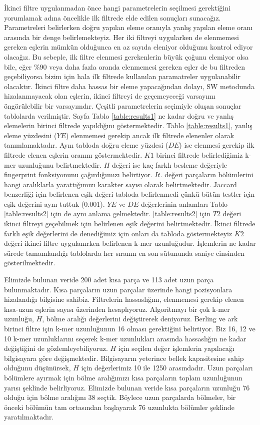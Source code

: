 İkinci filtre uygulanmadan önce hangi parametrelerin seçilmesi gerektiğini yorumlamak adına öncelikle ilk filtrede elde edilen sonuçları sunacağız. Parametreleri belirlerken doğru yapılan eleme oranıyla yanlış yapılan eleme oranı arasında bir denge belirlemekteyiz. Her iki filtreyi uygularken de elenmemesi gereken eşlerin mümkün olduğunca en az sayıda eleniyor olduğunu kontrol ediyor olacağız. Bu sebeple, ilk filtre elenmesi gerekenlerin büyük çoğunu elemiyor olsa bile, eğer \%90 veya daha fazla oranda elenmemesi gereken eşler de bu filtreden geçebiliyorsa bizim için hala ilk filtrede kullanılan paramatreler uygulanabilir olacaktır. İkinci filtre daha hassas bir eleme yapacağından dolayı, SW metodunda hizalanmayacak olan eşlerin, ikinci filtreyi de geçemeyeceği varsayımı öngörülebilir bir varsayımdır. Çeşitli parametrelerin seçimiyle oluşan sonuçlar tablolarda verilmiştir. Sayfa \pageref{table:results1} Tablo \ref{table:results1} ne kadar doğru ve yanlış elemelerin birinci filtrede yapıldığını göstermektedir. Tablo \ref{table:results1}, yanlış eleme yüzdesini ($YE$) elenmemesi gerekip ancak ilk filtrede elenenler olarak tanımlamaktadır. Aynı tabloda doğru eleme yüzdesi ($DE$) ise elenmesi gerekip ilk filtrede elenen eşlerin oranını göstermektedir. $K1$ birinci filtrede belirlediğimiz k-mer uzunluğunu belirtmektedir. $H$ değeri ise kaç farklı besleme değeriyle fingerprint fonksiyonunu çağırdığımızı belirtiyor. $It.$ değeri parçaların bölümlerini hangi aralıklarla yarattığımızı karakter sayısı olarak belirtmektedir. Jaccard benzerliği için belirlenen eşik değeri tabloda belirlenmedi çünkü bütün testler için eşik değerini aynı tuttuk (0.001). $YE$ ve $DE$ değerlerinin anlamları Tablo \ref{table:results2} için de aynı anlama gelmektedir. \ref{table:results2} için $T2$ değeri ikinci filtreyi geçebilmek için belirlenen eşik değerini belirtmektedir. İkinci filtrede farklı eşik değerlerini de denediğimiz için onları da tabloda göstermekteyiz $K2$ değeri ikinci filtre uygulanırken belirlenen k-mer uzunluğudur. İşlemlerin ne kadar sürede tamamlandığı tablolarda her sıranın en son sütununda saniye cinsinden gösterilmektedir.

Elimizde bulunan veride 200 adet kısa parça ve 113 adet uzun parça bulunmaktadır. Kısa parçaların uzun parçalar üzerinde hangi pozisyonlara hizalandığı bilgisine sahibiz. Filtrelerin hassaslığını, elenmemesi gerekip elenen kısa-uzun eşlerin sayısı üzerinden hesaplıyoruz. Algoritmayı bir çok k-mer uzunluğu, $H$, bölme aralığı değerlerini değiştirerek deniyoruz. Berling ve ark \cite{Berlin2015} birinci filtre için k-mer uzunluğunun 16 olması gerektiğini belirtiyor. Biz 16, 12 ve 10 k-mer uzunluklarını seçerek k-mer uzunlukları arasında hassaslığın ne kadar değiştiğini de gözlemleyebiliyoruz. $H$ için seçilen değer işlemlerin yapılacağı bilgisayara göre değişmektedir. Bilgisayarın yeterince bellek kapasitesine sahip olduğunu düşünürsek, $H$ için değerlerimiz 10 ile 1250 arasındadır. Uzun parçaları bölümlere ayırmak için bölme aralığımızı kısa parçaların toplam uzunluğunun yarısı şeklinde belirliyoruz. Elimizde bulunan veride kısa parçaların uzunluğu 76 olduğu için bölme aralığını 38 seçtik. Böylece uzun parçalarda bölmeler, bir önceki bölümün tam ortasından başlayarak 76 uzunlukta bölümler şeklinde yaratılmaktadır.

